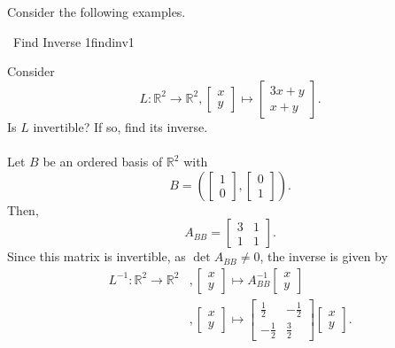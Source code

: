         \vphantom
        \\
        \\
        Consider the following examples.
        \begin{example}{\Difficulty\,\Difficulty\,\,Find Inverse 1}{findinv1}

            Consider
            \begin{equation*}
                L:\mathbb{R}^2\to\mathbb{R}^2,\begin{bmatrix} x \\ y \end{bmatrix}\mapsto\begin{bmatrix} 3x+y \\ x+y \end{bmatrix}.
            \end{equation*}
            Is \(L\) invertible? If so, find its inverse.
            \\
            \\
            Let \(B\) be an ordered basis of \(\mathbb{R}^2\) with
            \begin{equation*}
                B=\left(\begin{bmatrix} 1 \\ 0 \end{bmatrix}, \begin{bmatrix} 0 \\ 1 \end{bmatrix} \right).
            \end{equation*}
            Then,
            \begin{equation*}
                A_{BB}=\begin{bmatrix} 3 & 1 \\ 1 & 1 \end{bmatrix}.
            \end{equation*}
            Since this matrix is invertible, as \(\det A_{BB}\neq 0\), the inverse is given by
            \begin{align*}
                L^{-1}:\mathbb{R}^2\to\mathbb{R}^2&,\begin{bmatrix} x \\ y \end{bmatrix}\mapsto A_{BB}^{-1}\begin{bmatrix} x \\ y \end{bmatrix} \\
                &,\begin{bmatrix} x \\ y \end{bmatrix}\mapsto \begin{bmatrix} \frac{1}{2} & -\frac{1}{2} \\ -\frac{1}{2} & \frac{3}{2} \end{bmatrix}\begin{bmatrix} x \\ y \end{bmatrix}.
            \end{align*}
        \end{example}
